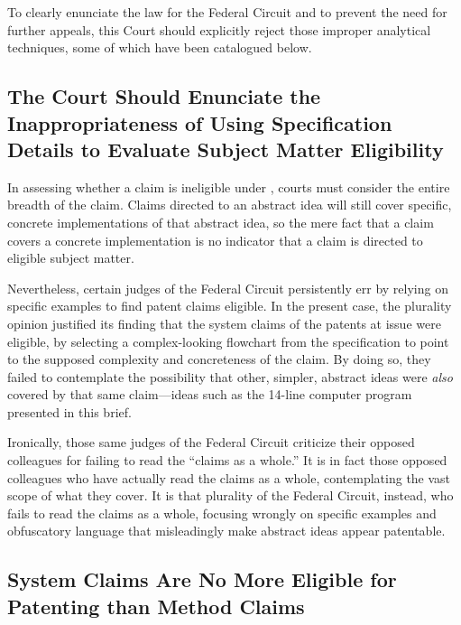 \documentclass{scotus}
\begin{document}
To clearly enunciate the law for the Federal Circuit and to prevent the need for
further appeals, this Court should explicitly reject those improper analytical
techniques, some of which have been catalogued below.



%
%
\subsection{The Court Should Enunciate the Inappropriateness of Using
Specification Details to Evaluate Subject Matter Eligibility}

In assessing whether a claim is ineligible under , courts must
consider the entire breadth of the claim. Claims directed to an abstract idea
will still cover specific, concrete implementations of that abstract idea, so
the mere fact that a claim covers a concrete implementation is no indicator that
a claim is directed to eligible subject matter.

Nevertheless, certain judges of the Federal Circuit persistently err by relying
on specific examples to find patent claims eligible. In the present case, the
plurality opinion justified its finding that the system claims of the patents at
issue were eligible, by selecting a complex-looking flowchart from the
specification to point to the supposed complexity and concreteness of the claim.
By doing so, they failed to contemplate the possibility that other, simpler,
abstract ideas were \emph{also} covered by that same claim---ideas such as the
14-line computer program presented in this brief.

Ironically, those same judges of the Federal Circuit criticize their opposed
colleagues for failing to read the ``claims as a whole.'' It is in fact those
opposed colleagues who have actually read the claims as a whole, contemplating
the vast scope of what they cover. It is that plurality of the Federal Circuit,
instead, who fails to read the claims as a whole, focusing wrongly on specific
examples and obfuscatory language that misleadingly make abstract ideas appear
patentable.



%
%
\subsection{System Claims Are No More Eligible for Patenting than Method Claims}
\end{document}
